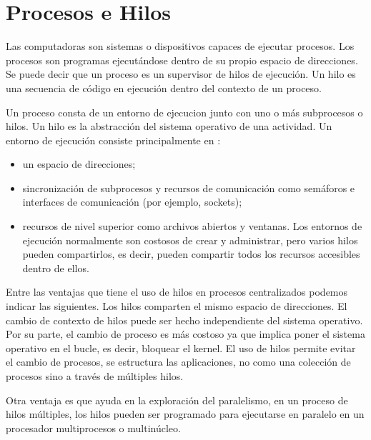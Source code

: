 
\setchapterpreamble[u]{\margintoc}

\chapter{Procesos e Hilos}  
\label{ch:Pro-Hil}
Las computadoras son sistemas o dispositivos capaces de ejecutar procesos.  
 Los \gls{procesos} son programas ejecutándose dentro de su propio espacio de direcciones. Se puede decir que un proceso es un supervisor de \gls{hilos} de ejecución. Un hilo es una secuencia de código en ejecución dentro del contexto de un proceso. \cite{Steen2017}

Un proceso consta de un \gls{entorno de ejecucion} junto con uno o más subprocesos o  hilos. Un hilo es la abstracción del sistema operativo de una actividad. Un entorno de ejecución
consiste principalmente en \cite{Coulouris2011}:
\begin{itemize}
	\item  un espacio de direcciones;
	\item sincronización de subprocesos y recursos de comunicación como semáforos e interfaces de comunicación (por ejemplo, sockets);
	\item recursos de nivel superior como archivos abiertos y ventanas. Los entornos de ejecución normalmente son costosos de crear y administrar, pero varios hilos pueden compartirlos, es decir, pueden compartir todos los recursos accesibles dentro de ellos.
\end{itemize}
 
 
Entre las ventajas que tiene el uso de hilos en procesos centralizados podemos indicar las siguientes. Los hilos comparten el mismo espacio de direcciones. El cambio de \gls{contexto de hilos} puede ser hecho independiente del sistema operativo. Por su parte, el cambio de proceso es más costoso ya que implica poner el sistema operativo en el bucle, es decir, bloquear el kernel. El uso de hilos permite evitar el cambio de procesos, se  estructura las  aplicaciones, no como una colección de procesos sino a través de múltiples hilos.

Otra ventaja es que ayuda en la exploración del paralelismo, en  un proceso de hilos múltiples, los hilos pueden ser programado para ejecutarse en paralelo en un procesador multiprocesos o multinúcleo. 
				

